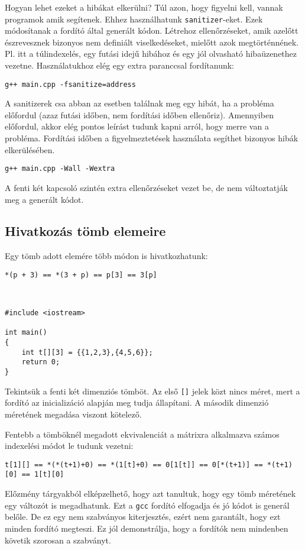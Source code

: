 \documentclass[../cpp_book/cpp_book.tex]{subfiles}
\begin{document}
	Hogyan lehet ezeket a hibákat elkerülni? Túl azon, hogy figyelni kell, vannak programok amik segítenek. Ehhez használhatunk \texttt{sanitizer}-eket. Ezek módosítanak a fordító által generált kódon. Létrehoz ellenőrzéseket, amik azelőtt észrevesznek bizonyos nem definiált viselkedéseket, mielőtt azok megtörténnének. Pl. itt a túlindexelés, egy futási idejű hibához és egy jól olvasható hibaüzenethez vezetne. Használatukhoz elég egy extra paranccsal fordítanunk:
	
	{\centering\texttt{g++ main.cpp -fsanitize=address}\par }
	
	A sanitizerek csa abban az esetben találnak meg egy hibát, ha a probléma előfordul (azaz futási időben, nem fordítási időben ellenőriz). Amennyiben előfordul, akkor elég pontos leírást tudunk kapni arról, hogy merre van a probléma. Fordítási időben a figyelmeztetések használata segíthet bizonyos hibák elkerülésében.
	
	{\centering \texttt{g++ main.cpp -Wall -Wextra} \par}
	
	A fenti két kapcsoló szintén extra ellenőrzéseket vezet be, de nem változtatják meg a generált kódot.
	\subsection{Hivatkozás tömb elemeire}
	Egy tömb adott elemére több módon is hivatkozhatunk:
	
	{\centering \texttt{*(p + 3) == *(3 + p) == p[3] == 3[p]} \par}
	\
	\begin{lstlisting}
#include <iostream>

int main()
{
	int t[][3] = {{1,2,3},{4,5,6}};
	return 0;
}
	\end{lstlisting}
	Tekintsük a fenti két dimenziós tömböt. Az első \texttt{[]} jelek közt nincs méret, mert a fordító az inicializáció alapján meg tudja állapítani. A második dimenzió méretének megadása viszont kötelező.
	
	\medskip
	Fentebb a tömböknél megadott ekvivalenciát a mátrixra alkalmazva számos indexelési módot le tudunk vezetni:
	\medskip
	
	\begin{center}
		\texttt{t[1][] == *(*(t+1)+0) == *(1[t]+0) == 0[1[t]] == 0[*(t+1)] == *(t+1)[0] == 1[t][0] } 
		\end{center}
	\begin{note}
		Előzmény tárgyakból elképzelhető, hogy azt tanultuk, hogy egy tömb méretének egy változót is megadhatunk. Ezt a \texttt{gcc} fordító elfogadja és jó kódot is generál belőle. De ez egy nem szabványos kiterjesztés, ezért nem garantált, hogy ezt minden fordító megteszi. Ez jól demonstrálja, hogy a fordítók nem mindenben követik szorosan a szabványt.
	\end{note}
\end{document}
